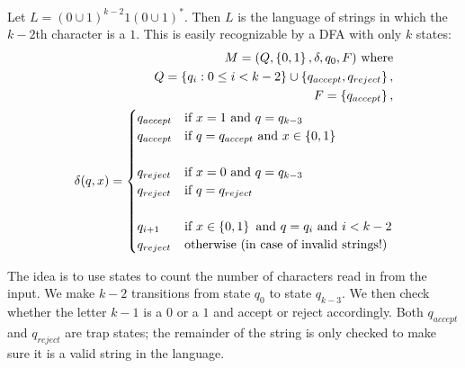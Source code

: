 \begin{problem}
\begin{enumalph}
      \step
      \begin{Answer}
        Let $L = (0 \cup 1)^{k-2}1(0 \cup 1)^*$.
        Then $L$ is the language of strings in which the $k-2$th character is a $1$.
        This is easily recognizable by a DFA with only $k$ states:
        \begin{align*}
          M = (Q, \left\{0, 1\right\}, \delta, q_0, F) \text{ where}\\
          Q = \left\{q_i : 0 \leq i < k-2\right\} \cup \left\{ q_{accept}, q_{reject}\right\},\\
          F = \left\{q_{accept}\right\},\\
          \delta(q, x) = \begin{cases}
            q_{accept} & \text{if } x = 1 \text{ and } q = q_{k-3} \\
            q_{accept} & \text{if } q = q_{accept} \text{ and } x \in \left\{0, 1\right\} \\ \\
            q_{reject} & \text{if } x = 0 \text{ and } q = q_{k-3} \\
            q_{reject} & \text{if } q = q_{reject} \\ \\
            q_{i+1} & \text{if } x \in \left\{0, 1\right\} \text{ and } q = q_i \text{ and } i < k-2 \\
            q_{reject} & \text{otherwise (in case of invalid strings!)}
          \end{cases}
        \end{align*}

        The idea is to use states to count the number of characters read in from the input.
        We make $k-2$ transitions from state $q_0$ to state $q_{k-3}$.
        We then check whether the letter $k-1$ is a $0$ or a $1$ and accept or reject accordingly.
        Both $q_{accept}$ and $q_{reject}$ are trap states; the remainder of the string
        is only checked to make sure it is a valid string in the language.


\end{Answer}
\end{enumalph}
\end{problem}
